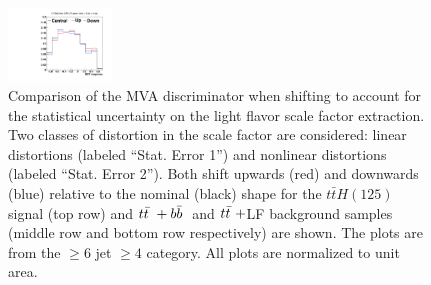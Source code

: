 \begin{description}
\begin{figure}[hbtp]
\begin{center}
   \includegraphics[width=0.245\textwidth]{Figures/Analysis_2_Diagrams/SystPlot_CMS_ttH_CSVLFStats2_ttbar_ljets_jge6_tge4}
   \caption{ Comparison of the MVA discriminator when shifting to
     account for the statistical uncertainty on the light flavor scale
     factor extraction.  Two classes of distortion in the scale factor
     are considered: linear distortions (labeled ``Stat. Error 1'')
     and nonlinear distortions (labeled ``Stat. Error 2'').  Both
     shift upwards (red) and downwards (blue) relative to the nominal
     (black) shape for the $t\bar{t}H(125)$ signal (top row) and
     $t{\bar{t}}~+b{\bar{b}}~$ and $t{\bar{t}}~+$LF background samples (middle row
     and bottom row respectively) are shown.  The plots are from the $\geq 6$ jet $\geq 4$
     category.  All plots are normalized to unit area.}
   \label{fig:CSVLFStats}
 \end{center}
\end{figure}


\end{description}
